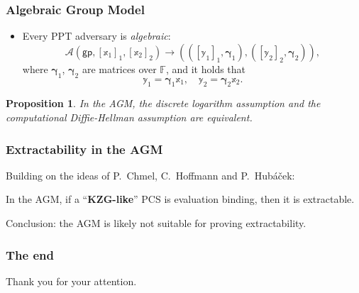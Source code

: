 \documentclass[9pt]{beamer}
\newcommand{\F}{\mathbb{F}}
\newcommand{\A}{\mathcal A}  %
\newcommand{\gp}{\mathsf{gp}}  %
\newtheorem{proposition}{Proposition}
\begin{document}
\begin{frame}
\frametitle{Algebraic Group Model}
\begin{itemize}
    \item Every PPT adversary is \textit{algebraic}:
    $$
    \A(\gp, [\mathbb x_1]_1, [\mathbb x_2]_2) \to (([\mathbb y_1]_1, \bm \gamma_1), ([\mathbb y_2]_2, \bm \gamma_2)),
    $$
    where $ \bm{\gamma}_1 $, $ \bm{\gamma}_2 $ are matrices over $ \F $, and it holds that 
    \begin{equation*}
    \mathbb y_1 = \bm{\gamma}_1 \mathbb x_1, \quad 
    \mathbb y_2 = \bm{\gamma}_2 \mathbb x_2. 
    \end{equation*}
\end{itemize}
\begin{proposition}
    In the AGM, the discrete logarithm assumption and the computational Diffie-Hellman assumption are equivalent.
\end{proposition}
\end{frame}


\begin{frame}
\frametitle{Extractability in the AGM}
Building on the ideas of P.\ Chmel, C.\ Hoffmann and P.\ Hubáček:
\begin{theorem}[informal]
In the AGM, if a ``\textbf{KZG-like}'' PCS is evaluation binding, then it is extractable.
\end{theorem}
Conclusion: the AGM is likely not suitable for proving extractability. 
\end{frame}


\begin{frame}
\frametitle{The end}
Thank you for your attention.
\end{frame}
\end{document}
